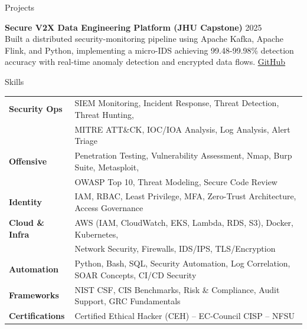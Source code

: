 \documentclass{resume}
\begin{document}
\vspace{-2mm}

\begin{rSection}{Projects}

\textbf{Secure V2X Data Engineering Platform (JHU Capstone)} \hfill 2025\\
Built a distributed security-monitoring pipeline using Apache Kafka, Apache Flink, and Python, implementing a micro-IDS achieving 99.48-99.98\% detection accuracy with real-time anomaly detection and encrypted data flows.
\href{https://github.com/steve-alex999/Data-Engineering-Optimizations-for-Secure-V2X-Communications.git}{GitHub}

\end{rSection}

\vspace{-2mm}

\begin{rSection}{Skills}

\begin{tabular}{ @{} >{\bfseries}l @{\hspace{4ex}} l }
Security Ops    & SIEM Monitoring, Incident Response, Threat Detection, Threat Hunting, \\
                & MITRE ATT\&CK, IOC/IOA Analysis, Log Analysis, Alert Triage \\
Offensive       & Penetration Testing, Vulnerability Assessment, Nmap, Burp Suite, Metasploit, \\
                & OWASP Top 10, Threat Modeling, Secure Code Review \\
Identity        & IAM, RBAC, Least Privilege, MFA, Zero-Trust Architecture, Access Governance \\
Cloud \& Infra  & AWS (IAM, CloudWatch, EKS, Lambda, RDS, S3), Docker, Kubernetes, \\
                & Network Security, Firewalls, IDS/IPS, TLS/Encryption \\
Automation      & Python, Bash, SQL, Security Automation, Log Correlation, SOAR Concepts, CI/CD Security \\
Frameworks      & NIST CSF, CIS Benchmarks, Risk \& Compliance, Audit Support, GRC Fundamentals \\
Certifications  & Certified Ethical Hacker (CEH) -- EC-Council \textbar{} CISP -- NFSU \\
\end{tabular}

\end{rSection}
\end{document}
